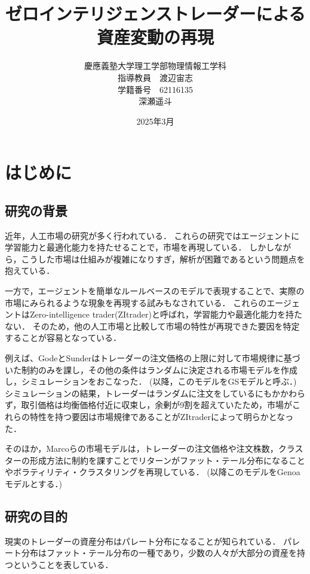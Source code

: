\documentclass[titlepage]{jsreport}
\title{ゼロインテリジェンストレーダーによる資産変動の再現}
\author{慶應義塾大学理工学部物理情報工学科\\
指導教員　渡辺宙志\\
学籍番号　62116135\\
深瀬遥斗}
\date{2025年3月}
\begin{document}
\maketitle
\setcounter{tocdepth}{2}
\tableofcontents

\chapter{はじめに} \label{chap:introduction}

\section{研究の背景}
近年，人工市場の研究が多く行われている\cite{artificial_market1,artificial_market2,artificial_market3,artificial_market4}．
これらの研究ではエージェントに学習能力と最適化能力を持たせることで，市場を再現している．
しかしながら，こうした市場は仕組みが複雑になりすぎ，解析が困難であるという問題点を抱えている\cite{Genoa}．

一方で，エージェントを簡単なルールベースのモデルで表現することで、実際の市場にみられるような現象を再現する試みもなされている\cite{zit1,zit2}．
これらのエージェントはZero-intelligence trader(ZItrader)と呼ばれ，学習能力や最適化能力を持たない．
そのため，他の人工市場と比較して市場の特性が再現できた要因を特定することが容易となっている．

例えば、GodeとSunderはトレーダーの注文価格の上限に対して市場規律に基づいた制約のみを課し，その他の条件はランダムに決定される市場モデルを作成し，シミュレーションをおこなった\cite{Gode_and_Sunder}．
(以降，このモデルをGSモデルと呼ぶ．)
シミュレーションの結果，トレーダーはランダムに注文をしているにもかかわらず，取引価格は均衡価格付近に収束し，余剰が9割を超えていたため，市場がこれらの特性を持つ要因は市場規律であることがZItraderによって明らかとなった．

そのほか，Marcoらの市場モデルは，トレーダーの注文価格や注文株数，クラスターの形成方法に制約を課すことでリターンがファット・テール分布になることやボラティリティ・クラスタリングを再現している\cite{Genoa}．
(以降このモデルをGenoaモデルとする．)

\section{研究の目的}
現実のトレーダーの資産分布はパレート分布になることが知られている\cite{Pareto}．
パレート分布はファット・テール分布の一種であり，少数の人々が大部分の資産を持つということを表している\cite{Pareto_fat-tailed}．
\end{document}
